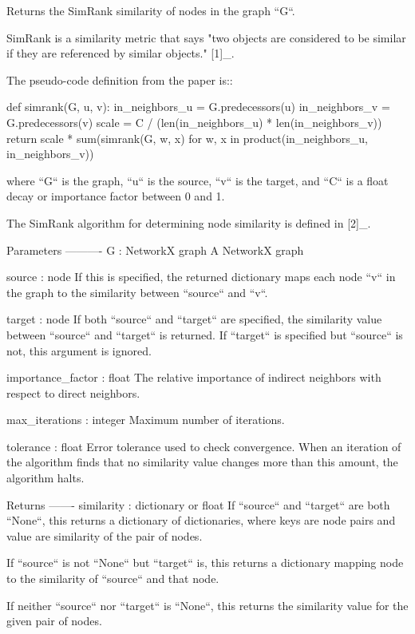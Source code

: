 \begin{DoxyVerb}Returns the SimRank similarity of nodes in the graph ``G``.

SimRank is a similarity metric that says "two objects are considered
to be similar if they are referenced by similar objects." [1]_.

The pseudo-code definition from the paper is::

    def simrank(G, u, v):
        in_neighbors_u = G.predecessors(u)
        in_neighbors_v = G.predecessors(v)
        scale = C / (len(in_neighbors_u) * len(in_neighbors_v))
        return scale * sum(simrank(G, w, x)
                           for w, x in product(in_neighbors_u,
                                               in_neighbors_v))

where ``G`` is the graph, ``u`` is the source, ``v`` is the target,
and ``C`` is a float decay or importance factor between 0 and 1.

The SimRank algorithm for determining node similarity is defined in
[2]_.

Parameters
----------
G : NetworkX graph
    A NetworkX graph

source : node
    If this is specified, the returned dictionary maps each node
    ``v`` in the graph to the similarity between ``source`` and
    ``v``.

target : node
    If both ``source`` and ``target`` are specified, the similarity
    value between ``source`` and ``target`` is returned. If
    ``target`` is specified but ``source`` is not, this argument is
    ignored.

importance_factor : float
    The relative importance of indirect neighbors with respect to
    direct neighbors.

max_iterations : integer
    Maximum number of iterations.

tolerance : float
    Error tolerance used to check convergence. When an iteration of
    the algorithm finds that no similarity value changes more than
    this amount, the algorithm halts.

Returns
-------
similarity : dictionary or float
    If ``source`` and ``target`` are both ``None``, this returns a
    dictionary of dictionaries, where keys are node pairs and value
    are similarity of the pair of nodes.

    If ``source`` is not ``None`` but ``target`` is, this returns a
    dictionary mapping node to the similarity of ``source`` and that
    node.

    If neither ``source`` nor ``target`` is ``None``, this returns
    the similarity value for the given pair of nodes.


\end{DoxyVerb}
